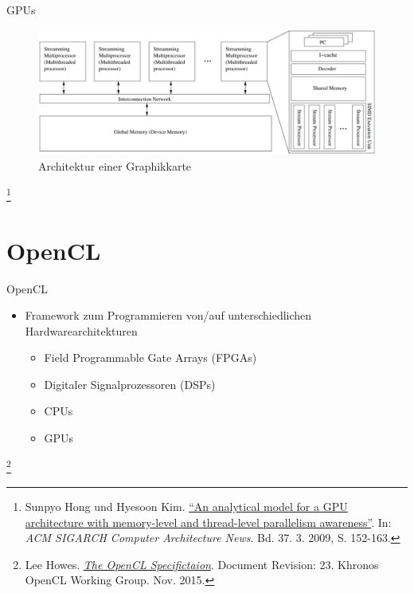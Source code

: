 \documentclass[10pt]{beamer}
\let\svthefootnote\thefootnote
\begin{document}
\begin{frame}{GPUs}
  \begin{figure}
    \centering
    \includegraphics[width=\linewidth]{figures/fg-gpu_architecture.pdf}
    \caption{Architektur einer Graphikkarte}
  \end{figure}

  \footnotesize
  \let\thefootnote\relax\footnote{Sunpyo Hong und Hyesoon Kim.
  \href{https://link.springer.com/article/10.1007\%2Fs00211-015-0757-y}{
  ``An analytical model for a GPU architecture with memory-level and thread-level parallelism awareness''}. In:   \textit{ACM SIGARCH Computer 
  Architecture News}. Bd. 37. 3. 2009, S. 152-163.}
  \addtocounter{footnote}{-1}\let\thefootnote\svthefootnote\relax
  \normalsize
\end{frame}

\section{OpenCL}

\begin{frame}{OpenCL}
  \begin{itemize}
    \item Framework zum Programmieren von/auf unterschiedlichen
          Hardwarearchitekturen
    \begin{itemize}
      \item Field Programmable Gate Arrays (FPGAs)
      \item Digitaler Signalprozessoren (DSPs)
      \item CPUs
      \item GPUs
    \end{itemize}
  \end{itemize}

  \footnotesize
  \let\thefootnote\relax\footnote{Lee Howes. \href{https://www.khronos.org/registry/OpenCL/specs/opencl-2.0.pdf}{\textit{The OpenCL Specifictaion}}. Document Revision: 23. Khronos OpenCL Working Group. Nov. 2015.}
  \addtocounter{footnote}{-1}\let\thefootnote\svthefootnote\relax
  \normalsize
\end{frame}
\end{document}
